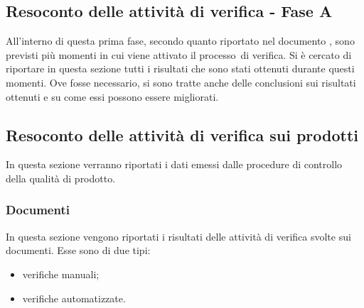 \documentclass[../PianoDiQualifica.tex]{subfiles}
\begin{document}
\begin{appendices}
\section{Resoconto delle attività di verifica - Fase A}
All'interno di questa prima fase\g, secondo quanto riportato nel documento \pianodiprogettov, sono previsti più momenti in cui viene attivato il processo\g\ di verifica. Si è cercato di riportare in questa sezione tutti i risultati che sono stati ottenuti durante questi momenti. Ove fosse necessario, si sono tratte anche delle conclusioni sui risultati ottenuti e su come essi possono essere migliorati.
	\subsection{Resoconto delle attività di verifica sui prodotti}
	In questa sezione verranno riportati i dati emessi dalle procedure di controllo della qualità di prodotto\g.
		\subsubsection{Documenti}
		In questa sezione vengono riportati i risultati delle attività di verifica svolte sui documenti. Esse sono di due tipi:
		\begin{itemize}
			\item verifiche manuali;
			\item verifiche automatizzate.
		\end{itemize}

\end{appendices}
\end{document}
